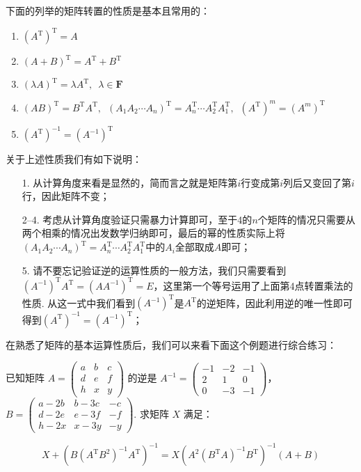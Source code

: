下面的列举的矩阵转置的性质是基本且常用的：

\begin{enumerate}
    \item $(A^\mathrm{T})^\mathrm{T}=A$

    \item $(A+B)^\mathrm{T}=A^\mathrm{T}+B^\mathrm{T}$

    \item $(\lambda A)^\mathrm{T}=\lambda A^\mathrm{T},\enspace \lambda \in \mathbf{F}$

    \item $(AB)^\mathrm{T}=B^\mathrm{T}A^\mathrm{T},\enspace(A_1A_2\cdots A_n)^\mathrm{T}=A_n^\mathrm{T}\cdots A_2^\mathrm{T}A_1^\mathrm{T},\enspace(A^\mathrm{T})^m=(A^m)^\mathrm{T}$

    \item $(A^\mathrm{T})^{-1}=(A^{-1})^\mathrm{T}$
\end{enumerate}
关于上述性质我们有如下说明：
\begin{itemize}
    \item[1.] 从计算角度来看是显然的，简而言之就是矩阵第$i$行变成第$i$列后又变回了第$i$行，因此矩阵不变；

    \item[2--4.] 考虑从计算角度验证只需暴力计算即可，至于4的$n$个矩阵的情况只需要从两个相乘的情况出发数学归纳即可，最后的幂的性质实际上将$(A_1A_2\cdots A_n)^\mathrm{T}=A_n^\mathrm{T}\cdots A_2^\mathrm{T}A_1^\mathrm{T}$中的$A_i$全部取成$A$即可；

    \item[5.] 请不要忘记验证逆的运算性质的一般方法，我们只需要看到$(A^{-1})^\mathrm{T}A^\mathrm{T}=(AA^{-1})^\mathrm{T}=E$，这里第一个等号运用了上面第4点转置乘法的性质. 从这一式中我们看到$(A^{-1})^\mathrm{T}$是$A^\mathrm{T}$的逆矩阵，因此利用逆的唯一性即可得到$(A^\mathrm{T})^{-1}=(A^{-1})^\mathrm{T}$；
\end{itemize}

在熟悉了矩阵的基本运算性质后，我们可以来看下面这个例题进行综合练习：
\begin{example}{}{}
    已知矩阵 $A=\begin{pmatrix}a & b & c \\ d & e & f \\ h & x & y\end{pmatrix}$ 的逆是 $A^{-1}=\begin{pmatrix}-1 & -2 & -1 \\ 2 & 1 & 0 \\ 0 & -3 & -1\end{pmatrix}$，\\
    $B=\begin{pmatrix}a-2b & b-3c & -c \\ d-2e & e-3f & -f \\ h-2x & x-3y & -y\end{pmatrix}$. 求矩阵 $X$ 满足：

    \[X+\left(B(A^\mathrm{T}B^2)^{-1}A^\mathrm{T}\right)^{-1}=X\left(A^2(B^\mathrm{T}A)^{-1}B^\mathrm{T}\right)^{-1}(A+B)\]
\end{example}

